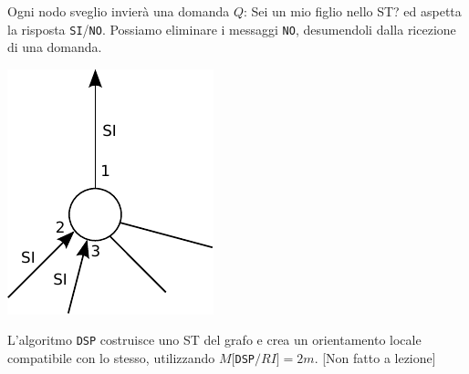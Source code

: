 Ogni nodo sveglio invierà una domanda $Q$: Sei un mio figlio nello ST? ed
aspetta la risposta \texttt{SI}/\texttt{NO}. Possiamo eliminare i messaggi
\texttt{NO}, desumendoli dalla ricezione di una domanda.


\begin{center}
    \includegraphics[scale=0.75]{images/n_32}
\end{center}

\begin{theorem}
    L'algoritmo \texttt{DSP} costruisce uno ST del grafo e crea un
    orientamento locale compatibile con lo stesso, utilizzando $M[$\texttt{DSP}$/
                RI] = 2m$. [Non fatto a lezione]
\end{theorem}

